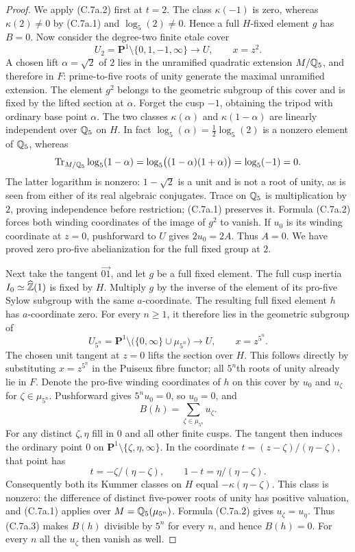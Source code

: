 \begin{proof}
We apply (C.7a.2) first at $t=2$. The class $\kappa(-1)$ is zero,
whereas $\kappa(2)\ne0$ by (C.7a.1) and $\log_5(2)\ne0$.
Hence a full $H$-fixed element $g$ has $B=0$.
Now consider the degree-two finite etale cover
\[
 U_2=\mathbf P^1\setminus\{0,1,-1,\infty\}
       \longrightarrow U,\qquad x=z^2.
\]
A chosen lift $\alpha=\sqrt2$ of $2$ lies in the unramified quadratic
extension $M/\mathbb Q_5$, and therefore in $F$: prime-to-five roots of unity
generate the maximal unramified extension. The element $g^2$ belongs to
the geometric subgroup of this cover and is fixed by the lifted section
at $\alpha$. Forget the cusp $-1$, obtaining the tripod with ordinary
base point $\alpha$.
The two classes $\kappa(\alpha)$ and $\kappa(1-\alpha)$ are linearly
independent over $\mathbb Q_5$ on $H$. In fact $\log_5(\alpha)=\frac12\log_5(2)$
is a nonzero element of $\mathbb Q_5$, whereas
\[
 \operatorname{Tr}_{M/\mathbb Q_5}\log_5(1-\alpha)
 =\log_5\bigl((1-\alpha)(1+\alpha)\bigr)=\log_5(-1)=0.
\]
The latter logarithm is nonzero: $1-\sqrt2$ is a unit and is not a root
of unity, as is seen from either of its real algebraic conjugates.
Trace on $\mathbb Q_5$ is multiplication by $2$, proving independence before
restriction; (C.7a.1) preserves it. Formula (C.7a.2) forces both winding
coordinates of the image of $g^2$ to vanish. If $u_0$ is its winding
coordinate at $z=0$, pushforward to $U$ gives $2u_0=2A$. Thus $A=0$.
We have proved zero pro-five abelianization for the full fixed group at $2$.

Next take the tangent $\overrightarrow{01}$, and let $g$ be a full fixed
element. The full cusp inertia $I_0\simeq\widehat{\mathbb Z}(1)$ is fixed by $H$.
Multiply $g$ by the inverse of the element of its pro-five Sylow subgroup
with the same $a$-coordinate. The resulting full fixed element $h$ has
$a$-coordinate zero. For every $n\ge1$, it therefore lies in the
geometric subgroup of
\[
 U_{5^n}=\mathbf P^1\setminus\bigl(\{0,\infty\}\cup\mu_{5^n}\bigr)
          \longrightarrow U,\qquad x=z^{5^n}.
\]
The chosen unit tangent at $z=0$ lifts the section over $H$. This follows
directly by substituting $x=z^{5^n}$ in the Puiseux fibre functor; all
$5^n$th roots of unity already lie in $F$. Denote the pro-five winding
coordinates of $h$ on this cover by $u_0$ and $u_\zeta$ for
$\zeta\in\mu_{5^n}$. Pushforward gives $5^nu_0=0$, so $u_0=0$, and
\[
 B(h)=\sum_{\zeta\in\mu_{5^n}}u_\zeta.                       \tag{C.7a.3}
\]
For any distinct $\zeta,\eta$ fill in $0$ and all other finite cusps.
The tangent then induces the ordinary point $0$ on
$\mathbf P^1\setminus\{\zeta,\eta,\infty\}$. In the coordinate
$t=(z-\zeta)/(\eta-\zeta)$, that point has
\[
 t=-\zeta/(\eta-\zeta),\qquad 1-t=\eta/(\eta-\zeta).
\]
Consequently both its Kummer classes on $H$ equal
$-\kappa(\eta-\zeta)$. This class is nonzero: the difference of distinct
five-power roots of unity has positive valuation, and (C.7a.1) applies
over $M=\mathbb Q_5(\mu_{5^n})$. Formula (C.7a.2) gives
$u_\zeta=u_\eta$. Thus (C.7a.3) makes $B(h)$ divisible by $5^n$ for
every $n$, and hence $B(h)=0$. For every $n$ all the $u_\zeta$ then vanish
as well.


\end{proof}
